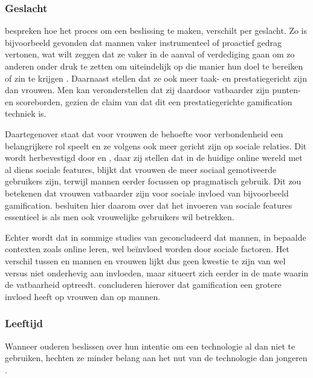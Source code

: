 \subsubsection{Geslacht}

\textcite{Venkatesh2000} bespreken hoe het proces om een beslissing te maken, verschilt per geslacht. Zo is bijvoorbeeld gevonden dat mannen vaker instrumenteel of proactief gedrag vertonen, wat wilt zeggen dat ze vaker in de aanval of verdediging gaan om zo anderen onder druk te zetten om uiteindelijk op die manier hun doel te bereiken of zin te krijgen \autocite{Spence1980}. Daarnaast stellen \textcite{Hoffman1972, Minton1980} dat ze ook meer taak- en prestatiegericht zijn dan vrouwen.
Men kan veronderstellen dat zij daardoor vatbaarder zijn punten- en scoreborden, gezien de claim van \textcite{Hamari2014} dat dit een prestatiegerichte gamification techniek is.

Daartegenover staat dat voor vrouwen de behoefte voor verbondenheid een belangrijkere rol speelt \autocite{Hoffman1972} en ze volgens \textcite{Minton1980, Spence1980} ook meer gericht zijn op sociale relaties. Dit wordt herbevestigd door \textcite{Haferkamp2012} en \textcite{Muscanell2012}, daar zij stellen dat in de huidige online wereld met al diens sociale features, blijkt dat vrouwen de meer sociaal gemotiveerde gebruikers zijn, terwijl mannen eerder focussen op pragmatisch gebruik. Dit zou betekenen dat vrouwen vatbaarder zijn voor sociale invloed van bijvoorbeeld gamification. \textcite{Koivisto2014} besluiten hier daarom over dat het invoeren van sociale features essentieel is als men ook vrouwelijke gebruikers wil betrekken.

Echter wordt dat in sommige studies van \textcite{Wang2008} geconcludeerd dat mannen, in bepaalde contexten zoals online leren, wel beïnvloed worden door sociale factoren. Het verschil tussen en mannen en vrouwen lijkt dus geen kwestie te zijn van wel versus niet onderhevig aan invloeden, maar situeert zich eerder in de mate waarin de vatbaarheid optreedt. \textcite{PoloPena2020} concluderen hierover dat gamification een grotere invloed heeft op vrouwen dan op mannen.

\subsubsection{Leeftijd}

Wanneer ouderen beslissen over hun intentie om een technologie al dan niet te gebruiken, hechten ze minder belang aan het nut van de technologie dan jongeren \autocite{Venkatesh2003}.

